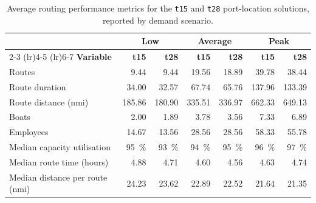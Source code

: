 \documentclass[12pt]{article}
\begin{document}
\begin{table}[htbp]
  \centering
  \caption{Average routing performance metrics for the \texttt{t15} and \texttt{t28} port-location solutions, reported by demand scenario.}
  \label{tab:detailed_kpis}

  \begin{tabular}{l|rrrrrr}
    \toprule
                                    & \multicolumn{2}{c}{\textbf{Low}} & \multicolumn{2}{c}{\textbf{Average}} & \multicolumn{2}{c}{\textbf{Peak}}                                                                \\
    \cmidrule(lr){2-3} \cmidrule(lr){4-5} \cmidrule(lr){6-7}
    \textbf{Variable}               & \textbf{t15}                     & \textbf{t28}                         & \textbf{t15}                      & \textbf{t28}       & \textbf{t15}       & \textbf{t28}       \\
    \midrule
    Routes                          & 9.44                             & 9.44                                 & 19.56                             & 18.89              & 39.78              & 38.44              \\
    Route duration                  & 34.00                            & 32.57                                & 67.74                             & 65.76              & 137.96             & 133.39             \\
    Route distance (nmi)            & 185.86                           & 180.90                               & 335.51                            & 336.97             & 662.33             & 649.13             \\
    Boats                           & 2.00                             & 1.89                                 & 3.78                              & 3.56               & 7.33               & 6.89               \\
    Employees                       & 14.67                            & 13.56                                & 28.56                             & 28.56              & 58.33              & 55.78              \\
    Median capacity utilisation     & \qty{95}{\percent}               & \qty{93}{\percent}                   & \qty{94}{\percent}                & \qty{95}{\percent} & \qty{96}{\percent} & \qty{97}{\percent} \\
    Median route time (hours)       & 4.88                             & 4.71                                 & 4.60                              & 4.56               & 4.63               & 4.74               \\
    Median distance per route (nmi) & 24.23                            & 23.62                                & 22.89                             & 22.52              & 21.64              & 21.35              \\
    \bottomrule
  \end{tabular}
\end{table}
\end{document}
